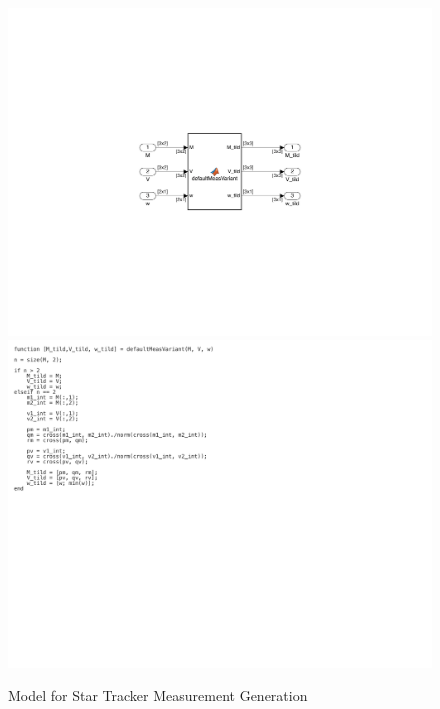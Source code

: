 \begin{figure}[H]
    \centering
    \captionsetup{ justification = centering }
    \includegraphics[trim={8cm 5cm 8cm 5cm},clip,width = 12cm]{Images/PS6/feedthrough_meas.png}
    \includegraphics[trim={0cm 10cm 10cm 0cm},clip,width = 15cm]{Images/PS6/feedthrough_meas_code.png}
    \caption{Model for Star Tracker Measurement Generation}
    \label{fig:feedthrough_meas}
\end{figure}

